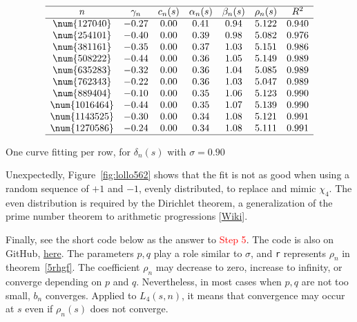 \documentclass[oneside,10pt]{book}
\renewcommand{\arraystretch}{1.4} %
\begin{document}
\begin{table}[H]
\small
\setlength\extrarowheight{-1pt}
\[
\begin{array}{ccccccc}
\hline
 n & \gamma_n & c_n(s) & \alpha_n(s) & \beta_n(s) & \rho_n(s) & R^2 \\
\hline
\num{127040}	&	-0.27	&	0.00	&	0.41	&	0.94	&	5.122	& 	0.940	\\
\num{254101}	&	-0.40	&	0.00	&	0.39	&	0.98	&	5.082	& 	0.976	\\
\num{381161}	&	-0.35	&	0.00	&	0.37	&	1.03	&	5.151	& 	0.986	\\
\num{508222}	&	-0.44	&	0.00	&	0.36	&	1.05	&	5.149	& 	0.989	\\
\num{635283}	&	-0.32	&	0.00	&	0.36	&	1.04	&	5.085	& 	0.989	\\
\num{762343}	&	-0.22	&	0.00	&	0.36	&	1.03	&	5.047	& 	0.989	\\
\num{889404}	&	-0.10	&	0.00	&	0.35	&	1.06	&	5.123	& 	0.990	\\
\num{1016464}	&	-0.44	&	0.00	&	0.35	&	1.07	&	5.139	& 	0.990	\\
\num{1143525}	&	-0.30	&	0.00	&	0.34	&	1.08	&	5.121	& 	0.991	\\
\num{1270586}	&	-0.24	&	0.00	&	0.34	&	1.08	&	5.111	& 	0.991	\\
\hline
\end{array}
\]
\caption{\label{tafghuh42s}One curve fitting per row, for $\delta_n(s)$ with $\sigma=0.90$}
\end{table}

Unexpectedly, Figure~\ref{fig:lollo562} shows that the fit is not as good when using a random sequence of $+1$ and $-1$, evenly distributed, to
 replace and mimic $\chi_4$. The even distribution is required by the \textcolor{index}{Dirichlet theorem}, a
 generalization of the prime number theorem to 
  arithmetic progressions [\href{https://en.wikipedia.org/wiki/Dirichlet\%27s_theorem_on_arithmetic_progressions}{Wiki}]. 

Finally, see the short code below as the answer to \textcolor{red}{Step 5}. 
The code is also on GitHub, 
 \href{https://github.com/VincentGranville/Experimental-Math-Number-Theory/blob/main/Source-Code/Dirichlet_L4_product_synthetic.py}{here}.
The parameters $p,q$ play a role similar to $\sigma$, 
 and \texttt{r} represents $\rho_n$ in theorem~\ref{5rhgf}. The coefficient $\rho_n$ may decrease to zero, increase to infinity, or converge
 depending on $p$ and $q$. Nevertheless, in most cases when $p, q$ are not too small, $b_n$ converges. Applied to $L_4(s,n)$, it means that convergence 
 may occur at $s$ even if $\rho_n(s)$ does not converge. 
 
\end{document}
